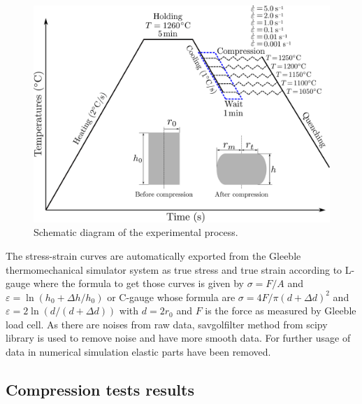\documentclass[twoside,english,1p,final,sort&compress]{elsarticle}
\theoremstyle{plain}
\begin{document}
\begin{figure}[!ht]
\centering
\includegraphics[width=0.8\columnwidth]{Figures/GleebleProcess}
\caption{Schematic diagram of the experimental process.}
\label{fig:GleebleProcess}
\end{figure}

The stress-strain curves are automatically exported from the Gleeble thermomechanical simulator system as true stress and true strain according to L-gauge where the formula to get those curves is given by $\sigma=F/A$ and $\varepsilon=\ln\left(h_0+\Delta h / h_0\right)$ or C-gauge whose formula are $\sigma = 4F/\pi(d+\Delta d)^2$ and $\varepsilon = 2\ln(d/(d+\Delta d))$ with $d = 2r_0$ and $F$ is the force as measured by Gleeble load cell. As there are noises from raw data, savgolfilter method from scipy library is used to remove noise and have more smooth data. For further usage of data in numerical simulation elastic parts have been removed.

\subsection{Compression tests results\label{sec:ComTestResults}}
\end{document}
